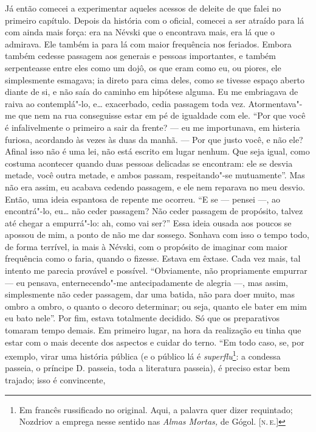 Já então comecei a experimentar aqueles acessos de deleite de que falei
no primeiro capítulo. Depois da história com o oficial, comecei a ser
atraído para lá com ainda mais força: era na Névski que o encontrava
mais, era lá que o admirava. Ele também ia para lá com maior frequência
nos feriados. Embora também cedesse passagem aos generais e pessoas
importantes, e também serpenteasse entre eles como um dojô, os que eram
como eu, ou piores, ele simplesmente esmagava; ia direto para cima
deles, como se tivesse espaço aberto diante de si, e não saía do caminho
em hipótese alguma. Eu me embriagava de raiva ao contemplá"-lo, e\ldots{}
exacerbado, cedia passagem toda vez. Atormentava"-me que nem na rua
conseguisse estar em pé de igualdade com ele. ``Por que você é
infalivelmente o primeiro a sair da frente? --- eu me importunava, em
histeria furiosa, acordando às vezes às duas da manhã. --- Por que justo
você, e não ele? Afinal isso não é uma lei, não está escrito em lugar
nenhum. Que seja igual, como costuma acontecer quando duas pessoas
delicadas se encontram: ele se desvia metade, você outra metade, e ambos
passam, respeitando"-se mutuamente''. Mas não era assim, eu acabava
cedendo passagem, e ele nem reparava no meu desvio. Então, uma ideia
espantosa de repente me ocorreu. ``E se --- pensei ---, ao encontrá"-lo,
eu\ldots{} não ceder passagem? Não ceder passagem de propósito, talvez até
chegar a empurrá"-lo: ah, como vai ser?'' Essa ideia ousada aos poucos se
apossou de mim, a ponto de não me dar sossego. Sonhava com isso o tempo
todo, de forma terrível, ia mais à Névski, com o propósito de imaginar
com maior frequência como o faria, quando o fizesse. Estava em êxtase.
Cada vez mais, tal intento me parecia provável e possível. ``Obviamente,
não propriamente empurrar --- eu pensava, enternecendo"-me antecipadamente
de alegria ---, mas assim, simplesmente não ceder passagem, dar uma
batida, não para doer muito, mas ombro a ombro, o quanto o decoro
determinar; ou seja, quanto ele bater em mim eu bato nele''. Por fim,
estava totalmente decidido. Só que os preparativos tomaram tempo demais.
Em primeiro lugar, na hora da realização eu tinha que estar com o mais
decente dos aspectos e cuidar do terno. ``Em todo caso, se, por exemplo,
virar uma história pública (e o público lá é \emph{superflu}\footnote{Em
  francês russificado no original. Aqui, a palavra quer dizer
  requintado; Nozdriov a emprega nesse sentido nas \emph{Almas Mortas,}
  de Gógol. {[}\textsc{n.\,e.}{]}}: a condessa passeia, o príncipe D. passeia, toda
a literatura passeia), é preciso estar bem trajado; isso é convincente,

